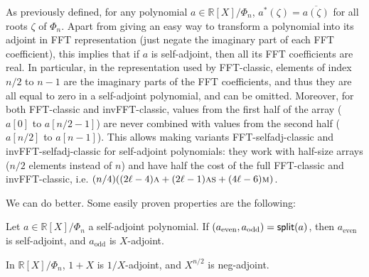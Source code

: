 \documentclass{llncs}
\newcommand{\bR}{\mathbb{R}}
\newcommand{\adj}[1]{{#1}^*}
\newcommand{\cconj}[1]{\overline{#1}}
\begin{document}
As previously defined, for any polynomial $a\in \bR[X]/\Phi_n$,
$\adj{a}(\zeta) = \cconj{a(\zeta)}$ for all roots $\zeta$ of $\Phi_n$.
Apart from giving an easy way to transform a polynomial into its adjoint
in FFT representation (just negate the imaginary part of each FFT
coefficient), this implies that if $a$ is self-adjoint, then all its FFT
coefficients are real. In particular, in the representation used by
\textsf{FFT-classic}, elements of index $n/2$ to $n-1$ are the imaginary
parts of the FFT coefficients, and thus they are all equal to zero in a
self-adjoint polynomial, and can be omitted. Moreover, for both
\textsf{FFT-classic} and \textsf{invFFT-classic}, values from the first
half of the array ($a[0]$ to $a[n/2-1]$) are never combined with values
from the second half ($a[n/2]$ to $a[n-1]$). This allows making variants
\textsf{FFT-selfadj-classic} and \textsf{invFFT-selfadj-classic} for
self-adjoint polynomials: they work with half-size arrays ($n/2$
elements instead of $n$) and have half the cost of the full
\textsf{FFT-classic} and \textsf{invFFT-classic}, i.e. $(n/4)((2\ell -
4)\text{\textsc{a}} + (2\ell - 1)\text{\textsc{as}} + (4\ell -
6)\text{\textsc{m}})$.

We can do better. Some easily proven properties are the following:
\begin{remark}\label{remark:split-selfadj}
Let $a \in \bR[X]/\Phi_n$ a self-adjoint polynomial. If
$(a_{\text{even}}, a_{\text{odd}}) = \text{\textsf{split}}(a)$, then
$a_{\text{even}}$ is self-adjoint, and $a_{\text{odd}}$ is $X$-adjoint.
\end{remark}

\begin{remark}
In $\bR[X]/\Phi_n$, $1 + X$ is $1/X$-adjoint, and $X^{n/2}$ is neg-adjoint.
\end{remark}
\end{document}
